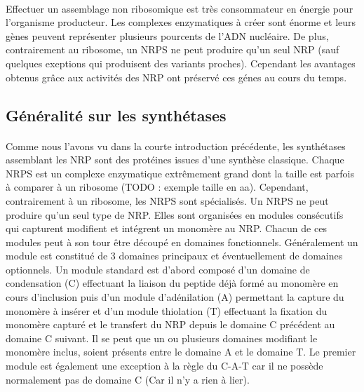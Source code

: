 \documentclass[12pt,french,twoside]{report}
\begin{document}
\paragraph{}Effectuer un assemblage non ribosomique est très consommateur en énergie pour l'organisme producteur.
Les complexes enzymatiques à créer sont énorme et leurs gènes peuvent représenter plusieurs pourcents de l'ADN nucléaire.
De plus, contrairement au ribosome, un NRPS ne peut produire qu'un seul NRP (sauf quelques exeptions qui produisent des variants proches).
Cependant les avantages obtenus grâce aux activités des NRP ont préservé ces génes au cours du temps.


\subsection{Généralité sur les synthétases}

\paragraph{}Comme nous l'avons vu dans la courte introduction précédente, les synthétases assemblant les NRP sont des protéines issues d'une synthèse classique.
Chaque NRPS est un complexe enzymatique extrêmement grand dont la taille est parfois à comparer à un ribosome (TODO : exemple taille en aa).
Cependant, contrairement à un ribosome, les NRPS sont spécialisés.
Un NRPS ne peut produire qu'un seul type de NRP.
Elles sont organisées en modules consécutifs qui capturent modifient et intégrent un monomère au NRP\cite{schwarzer_nonribosomal_2003,marahiel_modular_1997}.
Chacun de ces modules peut à son tour être découpé en domaines fonctionnels.
Généralement un module est constitué de 3 domaines principaux et éventuellement de domaines optionnels\cite{finking_biosynthesis_2004}.
Un module standard est d'abord composé d'un domaine de condensation (C) effectuant la liaison du peptide déjà formé au monomère en cours d'inclusion puis d'un module d'adénilation (A) permettant la capture du monomère à insérer et d'un module thiolation (T) effectuant la fixation du monomère capturé et le transfert du NRP depuis le domaine C précédent au domaine C suivant.
Il se peut que un ou plusieurs domaines modifiant le monomère inclus, soient présents entre le domaine A et le domaine T.
Le premier module est également une exception à la règle du C-A-T car il ne possède normalement pas de domaine C (Car il n'y a rien à lier).
\end{document}
